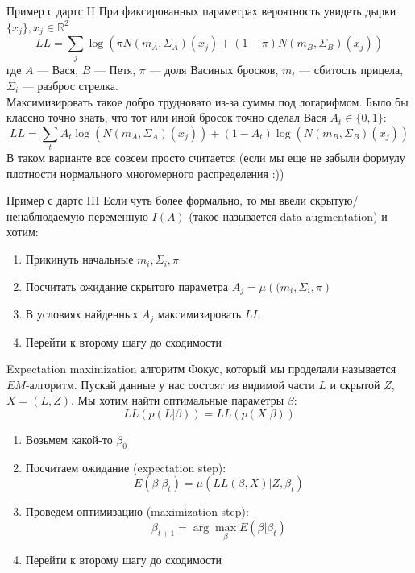 \documentclass[14pt, fleqn, xcolor={dvipsnames, table}]{beamer}
\begin{document}
\begin{frame}{Пример с дартс II}
\small
При фиксированных параметрах вероятность увидеть дырки $\{x_j\}, x_j \in \mathbb{R}^2$
$$
LL = \sum_j \log(\pi N(m_A, \Sigma_A)(x_j) + (1 - \pi) N(m_B, \Sigma_B)(x_j))
$$
где $A$ --- Вася, $B$ --- Петя, $\pi$ --- доля Васиных бросков, $m_i$ --- сбитость прицела, $\Sigma_i$ --- разброс стрелка. \\
Максимизировать такое добро трудновато из-за суммы под логарифмом. Было бы классно точно знать, что тот или иной бросок точно сделал Вася $A_t \in \{0,1\}$:
$$
LL = \sum_t A_t \log(N(m_A, \Sigma_A)(x_j)) +  (1 - A_t) \log(N(m_B, \Sigma_B)(x_j))
$$
В таком варианте все совсем просто считается (если мы еще не забыли формулу плотности нормального многомерного распределения :))
\end{frame}

\begin{frame}{Пример с дартс III}
\small
Если чуть более формально, то мы ввели скрытую/ненаблюдаемую переменную $I(A)$ (такое называется data augmentation) и хотим:
\begin{enumerate}
  \item Прикинуть начальные $m_i, \Sigma_i, \pi$
  \item Посчитать ожидание скрытого параметра $A_j = \mu({(m_i, \Sigma_i}, \pi)$
  \item В условиях найденных $A_j$ максимизировать $LL$
  \item Перейти к второму шагу до сходимости
\end{enumerate}
\end{frame}

\begin{frame}{Expectation maximization алгоритм}
\small
Фокус, который мы проделали называется $EM$-алгоритм. Пускай данные у нас состоят из видимой части $L$ и скрытой $Z$, $X = (L,Z)$. Мы хотим найти оптимальные параметры $\beta$:
$$
LL(p(L|\beta)) = LL(p(X|\beta))
$$
\begin{enumerate}
  \item Возьмем какой-то $\beta_0$
  \item Посчитаем ожидание (expectation step):
  $$
  E(\beta | \beta_t) = \mu\left(LL(\beta,X) | Z,\beta_t \right)
  $$
  \item Проведем оптимизацию (maximization step):
  $$
  \beta_{t+1} = \arg \max_{\beta} E(\beta | \beta_t)
  $$
  \item Перейти к второму шагу до сходимости
\end{enumerate}
\end{frame}
\end{document}
